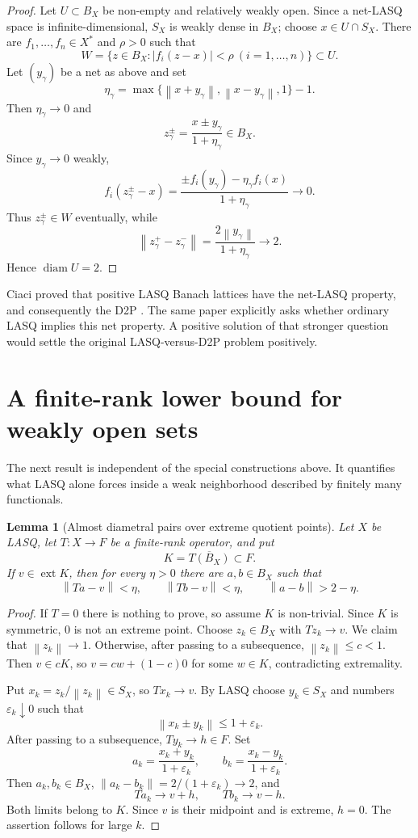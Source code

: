 \documentclass[11pt]{article}
\newtheorem{lemma}[theorem]{Lemma}
\newcommand{\eps}{\varepsilon}
\newcommand{\diam}{\operatorname{diam}}
\newcommand{\ext}{\operatorname{ext}}
\newcommand{\norm}[1]{\left\lVert #1\right\rVert}
\newcommand{\abs}[1]{\left\lvert #1\right\rvert}
\begin{document}
\begin{proof}
Let $U\subset B_X$ be non-empty and relatively weakly open.  Since a net-LASQ space is infinite-dimensional, $S_X$ is weakly dense in $B_X$; choose $x\in U\cap S_X$.  There are $f_1,\dots,f_n\in X^*$ and $\rho>0$ such that
\[
 W=\{z\in B_X:\abs{f_i(z-x)}<\rho\ (i=1,\dots,n)\}\subset U.
\]
Let $(y_\gamma)$ be a net as above and set
\[
 \eta_\gamma=
 \max\{\norm{x+y_\gamma},\norm{x-y_\gamma},1\}-1.
\]
Then $\eta_\gamma\to0$ and
\[
 z_\gamma^\pm=\frac{x\pm y_\gamma}{1+\eta_\gamma}\in B_X.
\]
Since $y_\gamma\to0$ weakly,
\[
 f_i(z_\gamma^\pm-x)
 =\frac{\pm f_i(y_\gamma)-\eta_\gamma f_i(x)}{1+\eta_\gamma}
 \longrightarrow0.
\]
Thus $z_\gamma^\pm\in W$ eventually, while
\[
 \norm{z_\gamma^+-z_\gamma^-}
 =\frac{2\norm{y_\gamma}}{1+\eta_\gamma}\longrightarrow2.
\]
Hence $\diam U=2$.
\end{proof}

Ciaci proved that positive LASQ Banach lattices have the net-LASQ property, and consequently the D2P \cite{Ciaci2023}.  The same paper explicitly asks whether ordinary LASQ implies this net property.  A positive solution of that stronger question would settle the original LASQ-versus-D2P problem positively.

\section{A finite-rank lower bound for weakly open sets}
\label{sec:finite-rank}

The next result is independent of the special constructions above.  It quantifies what LASQ alone forces inside a weak neighborhood described by finitely many functionals.

\begin{lemma}[Almost diametral pairs over extreme quotient points]
\label{lem:extreme-lifting}
Let $X$ be LASQ, let $T:X\to F$ be a finite-rank operator, and put
\[
 K=\overline{T(B_X)}\subset F.
\]
If $v\in\ext K$, then for every $\eta>0$ there are $a,b\in B_X$ such that
\[
 \norm{Ta-v}<\eta,
 \qquad
 \norm{Tb-v}<\eta,
 \qquad
 \norm{a-b}>2-\eta.
\]
\end{lemma}

\begin{proof}
If $T=0$ there is nothing to prove, so assume $K$ is non-trivial.  Since $K$ is symmetric, $0$ is not an extreme point.  Choose $z_k\in B_X$ with $Tz_k\to v$.  We claim that $\norm{z_k}\to1$.  Otherwise, after passing to a subsequence, $\norm{z_k}\le c<1$.  Then $v\in cK$, so $v=cw+(1-c)0$ for some $w\in K$, contradicting extremality.

Put $x_k=z_k/\norm{z_k}\in S_X$, so $Tx_k\to v$.  By LASQ choose $y_k\in S_X$ and numbers $\eps_k\downarrow0$ such that
\[
 \norm{x_k\pm y_k}\le1+\eps_k.
\]
After passing to a subsequence, $Ty_k\to h\in F$.  Set
\[
 a_k=\frac{x_k+y_k}{1+\eps_k},
 \qquad
 b_k=\frac{x_k-y_k}{1+\eps_k}.
\]
Then $a_k,b_k\in B_X$, $\norm{a_k-b_k}=2/(1+\eps_k)\to2$, and
\[
 Ta_k\to v+h,
 \qquad
 Tb_k\to v-h.
\]
Both limits belong to $K$.  Since $v$ is their midpoint and is extreme, $h=0$.  The assertion follows for large $k$.
\end{proof}
\end{document}
